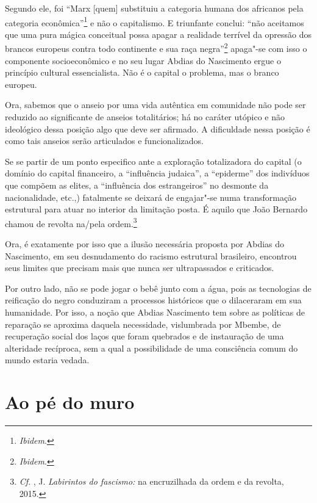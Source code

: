 Segundo ele, foi ``Marx [quem] substituiu a categoria humana dos
africanos pela categoria econômica''\footnote{\emph{Ibidem}.} e não o
capitalismo. E triunfante conclui: ``não aceitamos que uma pura mágica
conceitual possa apagar a realidade terrível da opressão dos brancos
europeus contra todo continente e sua raça negra''\footnote{\emph{Ibidem}.}
apaga"-se com isso o componente socioeconômico e no seu lugar Abdias do
Nascimento ergue o princípio cultural essencialista. Não é o capital o
problema, mas o branco europeu.

Ora, sabemos que o anseio por uma vida autêntica em comunidade não pode
ser reduzido ao significante de anseios totalitários; há no caráter
utópico e não ideológico dessa posição algo que deve ser afirmado. A
dificuldade nessa posição é como tais anseios serão articulados e
funcionalizados.

Se se partir de um ponto especifico ante a exploração totalizadora do
capital (o domínio do capital financeiro, a ``influência judaica'', a
``epiderme'' dos indivíduos que compõem as elites, a ``influência dos
estrangeiros'' no desmonte da nacionalidade, etc.,) fatalmente se
deixará de engajar"-se numa transformação estrutural para atuar no
interior da limitação posta. É aquilo que João Bernardo chamou de
revolta na/pela ordem.\footnote{\emph{Cf}. , J. \emph{Labirintos do
  fascismo:} na encruzilhada da ordem e da revolta, 2015.}

Ora, é exatamente por isso que a ilusão necessária proposta por Abdias
do Nascimento, em seu desnudamento do racismo estrutural brasileiro,
encontrou seus limites que precisam mais que nunca ser ultrapassados e
criticados.

Por outro lado, não se pode jogar o bebê junto com a água, pois as
tecnologias de reificação do negro conduziram a processos históricos que
o dilaceraram em sua humanidade. Por isso, a noção que Abdias Nascimento
tem sobre as políticas de reparação se aproxima daquela necessidade,
vislumbrada por Mbembe, de recuperação social dos laços que foram
quebrados e de instauração de uma alteridade recíproca, sem a qual a
possibilidade de uma consciência comum do mundo estaria vedada.

\chapter{Ao pé do muro}

